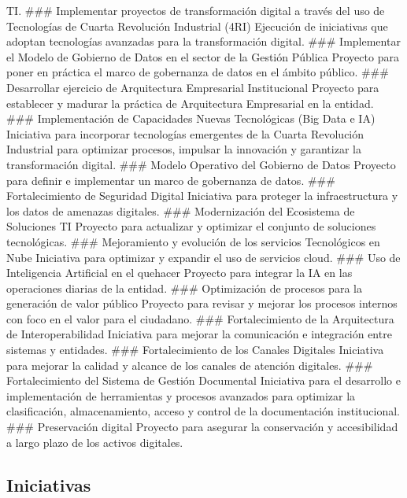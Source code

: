 \documentclass[
	a4paper, %
	12pt, %
]{include/CSSullivanBusinessReport}
\begin{document}
TI. \#\#\# Implementar proyectos de transformación digital a través del
uso de Tecnologías de Cuarta Revolución Industrial (4RI) Ejecución de
iniciativas que adoptan tecnologías avanzadas para la transformación
digital. \#\#\# Implementar el Modelo de Gobierno de Datos en el sector
de la Gestión Pública Proyecto para poner en práctica el marco de
gobernanza de datos en el ámbito público. \#\#\# Desarrollar ejercicio
de Arquitectura Empresarial Institucional Proyecto para establecer y
madurar la práctica de Arquitectura Empresarial en la entidad. \#\#\#
Implementación de Capacidades Nuevas Tecnológicas (Big Data e IA)
Iniciativa para incorporar tecnologías emergentes de la Cuarta
Revolución Industrial para optimizar procesos, impulsar la innovación y
garantizar la transformación digital. \#\#\# Modelo Operativo del
Gobierno de Datos Proyecto para definir e implementar un marco de
gobernanza de datos. \#\#\# Fortalecimiento de Seguridad Digital
Iniciativa para proteger la infraestructura y los datos de amenazas
digitales. \#\#\# Modernización del Ecosistema de Soluciones TI Proyecto
para actualizar y optimizar el conjunto de soluciones tecnológicas.
\#\#\# Mejoramiento y evolución de los servicios Tecnológicos en Nube
Iniciativa para optimizar y expandir el uso de servicios cloud. \#\#\#
Uso de Inteligencia Artificial en el quehacer Proyecto para integrar la
IA en las operaciones diarias de la entidad. \#\#\# Optimización de
procesos para la generación de valor público Proyecto para revisar y
mejorar los procesos internos con foco en el valor para el ciudadano.
\#\#\# Fortalecimiento de la Arquitectura de Interoperabilidad
Iniciativa para mejorar la comunicación e integración entre sistemas y
entidades. \#\#\# Fortalecimiento de los Canales Digitales Iniciativa
para mejorar la calidad y alcance de los canales de atención digitales.
\#\#\# Fortalecimiento del Sistema de Gestión Documental Iniciativa para
el desarrollo e implementación de herramientas y procesos avanzados para
optimizar la clasificación, almacenamiento, acceso y control de la
documentación institucional. \#\#\# Preservación digital Proyecto para
asegurar la conservación y accesibilidad a largo plazo de los activos
digitales.

\subsection{Iniciativas}\label{sec:iniciativas}

\begin{quote}
\end{quote}
\end{document}
